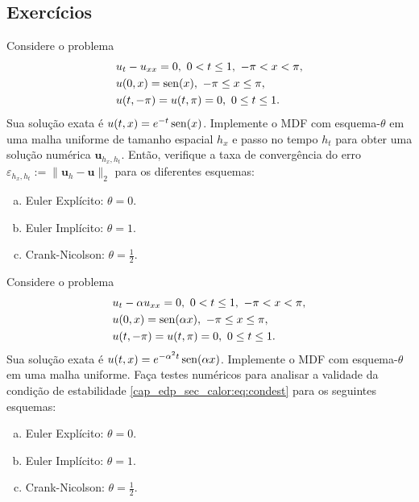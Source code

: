 \subsection{Exercícios}

\begin{exer}
  Considere o problema
  \begin{subequations}
    \begin{align}
      &u_t - u_{xx} = 0, ~0<t\leq 1, ~-\pi<x<\pi,\\
      &u(0,x) = \operatorname{sen}(x), ~-\pi\leq x\leq \pi,\\
      &u(t,-\pi) = u(t,\pi) = 0, ~0\leq t \leq 1.
    \end{align}
  \end{subequations}
  Sua solução exata é $u(t,x) = e^{-t}\operatorname{sen}(x)$. Implemente o MDF com esquema-$\theta$ em uma malha uniforme de tamanho espacial $h_x$ e passo no tempo $h_t$ para obter uma solução numérica $\pmb{u}_{h_x, h_t}$. Então, verifique a taxa de convergência do erro $\varepsilon_{h_x, h_t} := \|\pmb{u}_h - \pmb{u}\|_2$ para os diferentes esquemas:
  \begin{enumerate}[a)]
  \item Euler Explícito: $\theta = 0$.
  \item Euler Implícito: $\theta = 1$.
  \item Crank-Nicolson: $\theta = \frac{1}{2}$.
  \end{enumerate}
\end{exer}

\begin{exer}
  Considere o problema
  \begin{subequations}
    \begin{align}
      &u_t - \alpha u_{xx} = 0, ~0<t\leq 1, ~-\pi<x<\pi,\\
      &u(0,x) = \operatorname{sen}(\alpha x), ~-\pi\leq x\leq \pi,\\
      &u(t,-\pi) = u(t,\pi) = 0, ~0\leq t \leq 1.
    \end{align}
  \end{subequations}
  Sua solução exata é $u(t,x) = e^{-\alpha^2 t}\operatorname{sen}(\alpha x)$. Implemente o MDF com esquema-$\theta$ em uma malha uniforme. Faça testes numéricos para analisar a validade da condição de estabilidade \eqref{cap_edp_sec_calor:eq:condest} para os seguintes esquemas:
  \begin{enumerate}[a)]
  \item Euler Explícito: $\theta = 0$.
  \item Euler Implícito: $\theta = 1$.
  \item Crank-Nicolson: $\theta = \frac{1}{2}$.
  \end{enumerate}
\end{exer}

